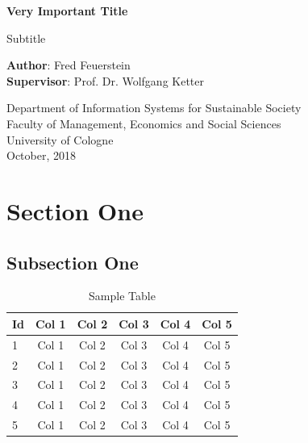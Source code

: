 \documentclass[a4paper]{article}
\begin{document}
\begin{titlepage}
    \begin{center}
        \vspace*{1cm}

        \Large
        \textbf{Very Important Title}

        \vspace{1.5cm}
        Subtitle

        \vspace{8.0cm}

        \large
        \textbf{Author}: Fred Feuerstein\\
        \large
        \textbf{Supervisor}: Prof. Dr. Wolfgang Ketter

        \vspace{1cm}
        \large
        Department of Information Systems for Sustainable Society\\
        Faculty of Management, Economics and Social Sciences\\
        University of Cologne\\

        \vspace{1cm}
        October, 2018

    \end{center}
\end{titlepage}

\tableofcontents
\clearpage
\listoffigures
\clearpage
\listoftables
\clearpage



\section{Section One}
\subsection{Subsection One}
\begin{longtable}{l|ccccc}
\caption{Sample Table}
\label{table:table-1}
\\
\hline
\hline
Id & Col 1 & Col 2 & Col 3 & Col 4 & Col 5\\
\hline
1 & Col 1 & Col 2 & Col 3 & Col 4 & Col 5\\
2 & Col 1 & Col 2 & Col 3 & Col 4 & Col 5\\
3 & Col 1 & Col 2 & Col 3 & Col 4 & Col 5\\
4 & Col 1 & Col 2 & Col 3 & Col 4 & Col 5\\
5 & Col 1 & Col 2 & Col 3 & Col 4 & Col 5\\
\hline
\hline
\end{longtable}
\end{document}
